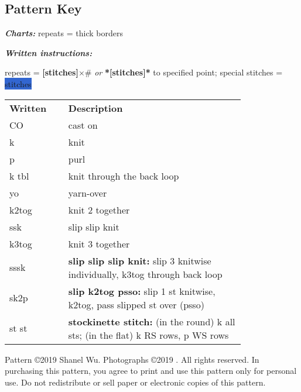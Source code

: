 \documentclass[12pt]{article}
\renewcommand{\arraystretch}{2} %
\newcommand{\vocab}[1]{\emph{\textbf{#1}}} %
\newcommand{\x}{$\times$}			%
\newcommand{\setrepeat}[2]{\textbf{[#1]}\x{#2}}		%
\newcommand{\blank}{\underline{\hspace{2em}} } %
\newcommand{\highlighted}[1]{\colorbox{highlight}{#1}} %
\newenvironment{frnote}
    {%
    	\setlength{\FrameRule}{1.5pt}
    	\def\FrameCommand{\fboxrule=\FrameRule\fboxsep=\FrameSep \fcolorbox{framecolor}{shadecolor}}
    	\MakeFramed {\FrameRestore}}
    {\setlength{\FrameRule}{1pt}
	\endMakeFramed}
\begin{document}
\begin{titlingpage}
\begin{multicols}{2}
\subsection*{Pattern Key}

\vocab{Charts:} repeats = thick borders \chart{\!\underline{\overline{-}}\!}  

\vocab{Written instructions:} 

repeats = \setrepeat{stitches}{\#} \emph{or} \textbf{*[stitches]*} to specified point; 
special stitches = \highlighted{stitches}
\vspace{-1em}

\begin{center}
{\renewcommand{\arraystretch}{1.5}
\begin{tabular}{| C{0.2\linewidth}  p{0.6\linewidth} | }
\thickhline {} 
\textbf{Written}	& \textbf{Description} \\ \thickhline
CO 	& cast on \\
k	&  knit \\
p	& purl   \\
k tbl	& knit through the back loop \\
yo		& yarn-over  \\
k2tog 	& knit 2 together \\
ssk		& slip slip knit \\
k3tog 	& knit 3 together \\
sssk		& \textbf{slip slip slip knit:} slip 3 knitwise individually, k3tog through back loop\\
sk2p	& \textbf{slip k2tog psso:} slip 1 st knitwise, k2tog, pass slipped st over (psso)\\
st st 	& \textbf{stockinette stitch:} (in the round) k all sts; (in the flat) k RS rows, p WS rows \\
\hline
\end{tabular}
}
\end{center}
\end{multicols}
\end{titlingpage}





\begin{frnote} \ssmall
Pattern \copyright 2019 Shanel Wu. Photographs \copyright 2019 \blank. %
All rights reserved. In purchasing this pattern, you agree to print and use this pattern only for personal use. Do not redistribute or sell paper or electronic copies of this pattern.
\end{frnote}
\end{document}
